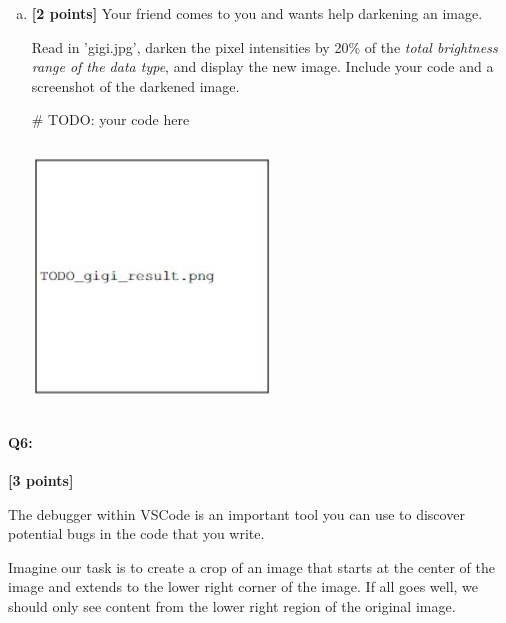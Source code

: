 \documentclass[11pt]{article}
\begin{document}
\begin{enumerate} [(a)]
\item \textbf{[2 points]} Your friend comes to you and wants help darkening an image.
\begin{tcolorbox}[colback=orange!5!white,colframe=orange!75!black]
Read in 'gigi.jpg', darken the pixel intensities by 20\% of the \emph{total brightness range of the data type}, and display the new image. Include your code and a screenshot of the darkened image.
\end{tcolorbox}

\begin{tcolorbox}[colback=white!5!white,colframe=green!75!black,height fill]
    \begin{python}
    # TODO: your code here
    \end{python}
    
    \includegraphics[width=0.5\textwidth,height=7cm,keepaspectratio]{images/TODO_gigi_result.jpg}
\end{tcolorbox}
\end{enumerate}



\pagebreak
\paragraph{Q6:} \textbf{[3 points]}

The debugger within VSCode is an important tool you can use to discover potential bugs in the code that you write.

Imagine our task is to create a crop of an image that starts at the center of the image and extends to the lower right corner of the image. If all goes well, we should only see content from the lower right region of the original image.
\end{document}
